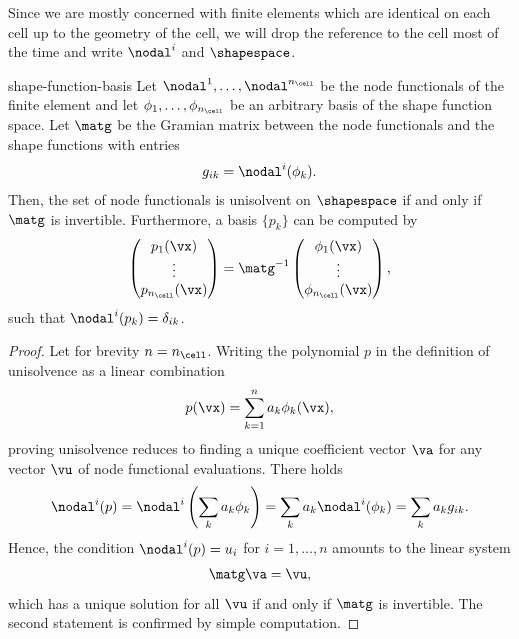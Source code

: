 \begin{intro}
  Since we are mostly concerned with finite elements which are
  identical on each cell up to the geometry of the cell, we will drop
  the reference to the cell most of the time and write $\nodal^i$ and
  $\shapespace$.
\end{intro}

\begin{Lemma}{shape-function-basis}
  Let $\nodal^1,\dots,\nodal^{n_{\cell}}$ be the node functionals of the
  finite element and let $\phi_1,\dots,\phi_{n_{\cell}}$ be an arbitrary
  basis of the shape function space.  Let $\matg$ be the Gramian matrix
  between the node functionals and the shape functions with entries
  \begin{gather}
    g_{ik} = \nodal^i(\phi_k).
  \end{gather}
  Then, the set of node functionals is unisolvent on $\shapespace$ if
  and only if $\matg$ is invertible. Furthermore, a
  basis $\{p_k\}$ can be computed by
  \begin{gather}
    \begin{pmatrix}
      p_1(\vx)\\\vdots\\p_{n_{\cell}}(\vx)
    \end{pmatrix}
    = \matg^{-1}
    \begin{pmatrix}
      \phi_1(\vx)\\\vdots\\\phi_{n_{\cell}}(\vx)
    \end{pmatrix},
  \end{gather}
  such that $\nodal^i(p_k) = \delta_{ik}$.
\end{Lemma}

\begin{proof}
  Let for brevity $n=n_{\cell}$. Writing the polynomial $p$ in the
  definition of unisolvence as a linear combination
  \begin{gather}
    p(\vx) = \sum_{k=1}^n a_k \phi_k(\vx),
  \end{gather}
  proving unisolvence reduces to finding a unique coefficient vector
  $\va$ for any vector $\vu$ of node functional evaluations. There holds
  \begin{gather}
    \nodal^i(p)
    = \nodal^i\left(\sum_k a_k\phi_k\right)
    = \sum_k a_k \nodal^i(\phi_k)
    = \sum_k a_k g_{ik}.
  \end{gather}
  Hence, the condition $\nodal^i(p) = u_i$ for $i=1,\dots,n$ amounts
  to the linear system
  \begin{gather}
    \matg\va = \vu,
  \end{gather}
  which has a unique solution for all $\vu$ if and only if $\matg$ is
  invertible. The second statement is confirmed by simple computation.
\end{proof}

